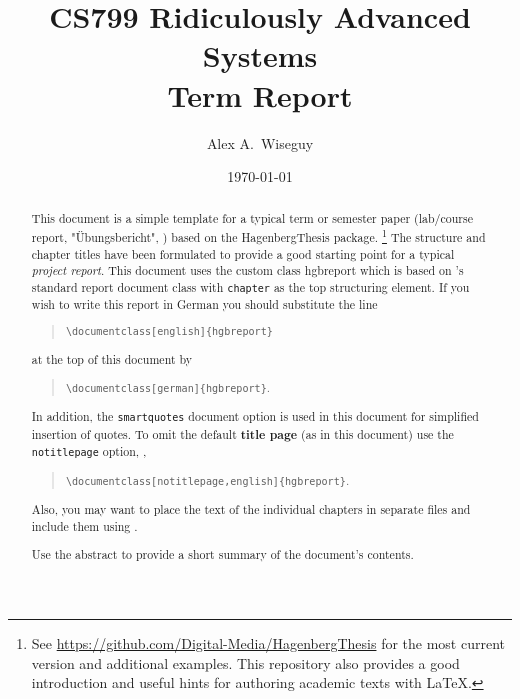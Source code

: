 \documentclass[english,notitlepage,smartquotes]{hgbreport}
\author{Alex A.\ Wiseguy}                    %
\title{CS799 Ridiculously Advanced Systems\\ %
			Term Report}	                 %
\date{\today}
\begin{document}

\maketitle

\begin{abstract}\noindent
This document is a simple template for a typical term or semester paper
(lab/course report, "Übungsbericht", \etc) based on the \textsf{HagenbergThesis}
\latex package.%
\footnote{See \url{https://github.com/Digital-Media/HagenbergThesis} for the
	most current version and additional examples. This repository also provides
	a good introduction and useful hints for authoring academic texts with
	LaTeX.}
The structure and chapter titles have been formulated to provide a good
starting point for a typical \emph{project report}. This document uses the
custom class \textsf{hgbreport} which is based on \latex's standard
\textsf{report} document class with \texttt{chapter} as the top structuring
element. If you wish to write this report in German you should substitute the
line
%
\begin{quote}
	\verb!\documentclass[english]{hgbreport}! 
\end{quote}
%
at the top of this document by
%
\begin{quote}
	\verb!\documentclass[german]{hgbreport}!.
\end{quote}
%
In addition, the \texttt{smartquotes} document option is used in this document
for simplified insertion of quotes. To omit the default \textbf{title page}
(as in this document) use the \texttt{notitlepage} option, \eg,
%
\begin{quote}
	\verb!\documentclass[notitlepage,english]{hgbreport}!.
\end{quote}
%
Also, you may want to place the text of the individual chapters in separate
files and include them using \verb!!.

\bigskip
\noindent
Use the abstract to provide a short summary of the document's contents.
\end{abstract}

\tableofcontents
\end{document}
